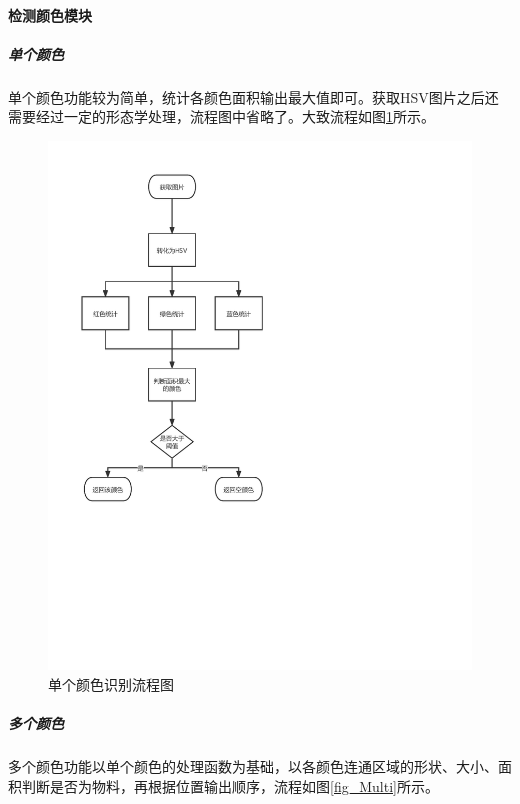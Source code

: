 \documentclass[a4paper,11pt,UTF8]{ctexart}
\begin{document}
\paragraph{检测颜色模块}
\subparagraph{单个颜色}
单个颜色功能较为简单，统计各颜色面积输出最大值即可。获取HSV图片之后还需要经过一定的形态学处理，流程图中省略了。大致流程如图\ref{fig_Single}所示。
\begin{figure}[htbp]
  \centering
  \includegraphics{单个颜色.pdf}
  \caption{单个颜色识别流程图}\label{fig_Single}
\end{figure}

\newpage
\subparagraph{多个颜色}
多个颜色功能以单个颜色的处理函数为基础，以各颜色连通区域的形状、大小、面积判断是否为物料，再根据位置输出顺序，流程如图\ref{fig_Multi}所示。
\end{document}
